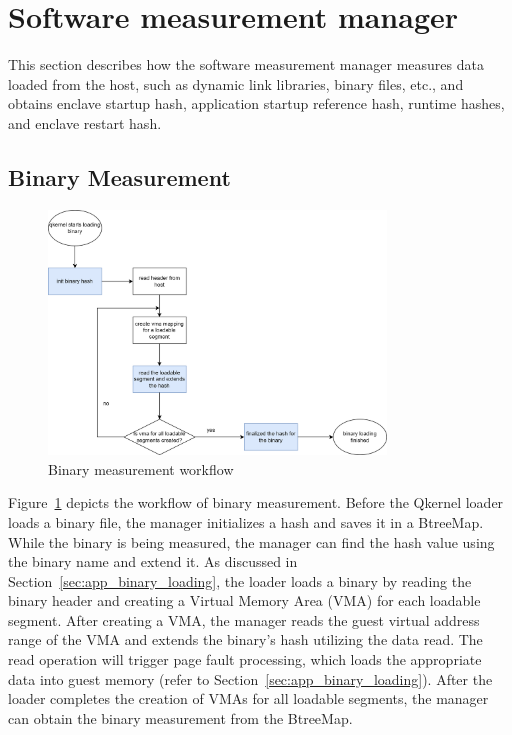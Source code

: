 \section{Software measurement manager}
\label{sec:impl_measurement}

This section describes how the software measurement manager measures data loaded from the host, such as dynamic link libraries, binary files, etc., and obtains enclave startup hash, application startup reference hash, runtime hashes, and enclave restart hash.

\subsection{Binary Measurement}

\begin{figure}[!htb]
    \centering
    \includegraphics[width=0.8\textwidth]{images/measure_binary.png}
    \caption[Binary measurement workflow]{Binary measurement workflow}
    \label{fig:binary_measurement}
\end{figure}

Figure~\ref{fig:binary_measurement} depicts the workflow of binary measurement. Before the Qkernel loader loads a binary file, the manager initializes a hash and saves it in a BtreeMap. While the binary is being measured, the manager can find the hash value using the binary name and extend it. 
As discussed in Section~\ref{sec:app_binary_loading}, the loader loads a binary by reading the binary header and creating a Virtual Memory Area (VMA) for each loadable segment. After creating a VMA, the manager reads the guest virtual address range of the VMA and extends the binary's hash utilizing 
the data read. The read operation will trigger page fault processing, which loads the appropriate data into guest memory (refer to Section~\ref{sec:app_binary_loading}). After the loader completes the creation of VMAs for all loadable segments, the manager can obtain the binary measurement 
from the BtreeMap.




